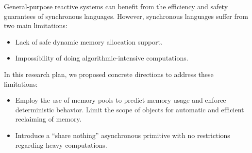 \documentclass[pdftex,12pt,a4paper]{article}
\begin{document}
General-purpose reactive systems can benefit from the efficiency and safety 
guarantees of synchronous languages.
%
However, synchronous languages suffer from two main limitations:

\begin{itemize}
    \item Lack of safe dynamic memory allocation support.
    \item Impossibility of doing algorithmic-intensive computations.
\end{itemize}

In this research plan, we proposed concrete directions to address these 
limitations:

\begin{itemize}
    \item Employ the use of memory pools to predict memory usage and enforce 
    deterministic behavior.
    Limit the scope of objects for automatic and efficient reclaiming of 
    memory.
    \item Introduce a ``share nothing'' asynchronous primitive with no 
    restrictions regarding heavy computations.
\end{itemize}
 
\end{document}
